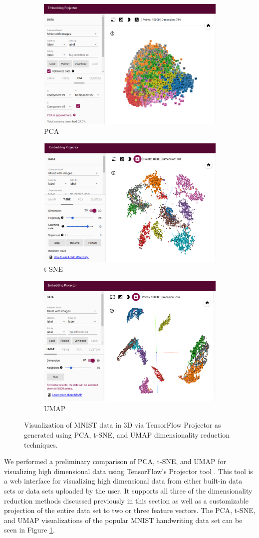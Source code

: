 \begin{figure}
\centering
\begin{subfigure}{1.0\textwidth}
\centering
\includegraphics[width=.49\textwidth]{4/pca.png}
\caption{PCA}
\end{subfigure}
\begin{subfigure}{1.0\textwidth}
\centering
\includegraphics[width=.49\textwidth]{4/tsne.png}
\caption{t-SNE}
\end{subfigure}
\begin{subfigure}{1.0\textwidth}
\centering
\includegraphics[width=.5\textwidth]{4/umap.png}
\caption{UMAP}
\end{subfigure}
\caption{Visualization of MNIST data in 3D via TensorFlow Projector as generated using PCA, t-SNE, and UMAP dimensionality reduction techniques.}
\label{ch4:fig:data-viz}
\end{figure}

We performed a preliminary comparison of PCA, t-SNE, and UMAP for visualizing high dimensional data using TensorFlow's Projector tool \cite{TFProjector}. This tool is a web interface for visualizing high dimensional data from either built-in data sets or data sets uploaded by the user. It supports all three of the dimensionality reduction methods discussed previously in this section as well as a customizable projection of the entire data set to two or three feature vectors. The PCA, t-SNE, and UMAP visualizations of the popular MNIST handwriting data set can be seen in Figure \ref{ch4:fig:data-viz}. 

